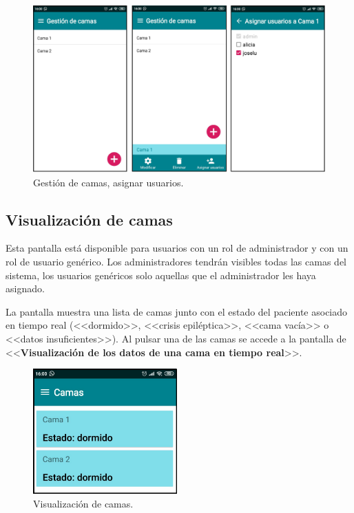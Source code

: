 \begin{figure}[H]
	\centering
	\includegraphics[width=1\textwidth]{../img/gestiondecamas.png}
	\caption{Gestión de camas, asignar usuarios.}
	\label{fig:gestiondecamas}
\end{figure}

\subsection{Visualización de camas}

Esta pantalla está disponible para usuarios con un rol de administrador y con un rol de usuario genérico. Los administradores tendrán visibles todas las camas del sistema, los usuarios genéricos solo aquellas que el administrador les haya asignado. 

La pantalla muestra una lista de camas junto con el estado del paciente asociado en tiempo real (<<dormido>>, <<crisis epiléptica>>, <<cama vacía>> o <<datos insuficientes>>). Al pulsar una de las camas se accede a la pantalla de <<\textbf{Visualización de los datos de una cama en tiempo real}>>. 

\begin{figure}[H]
	\centering
	\includegraphics[width=0.5\textwidth]{../img/visualizaciondecamas.png}
	\caption{Visualización de camas.}
	\label{fig:visualizaciondecamas}
\end{figure}

